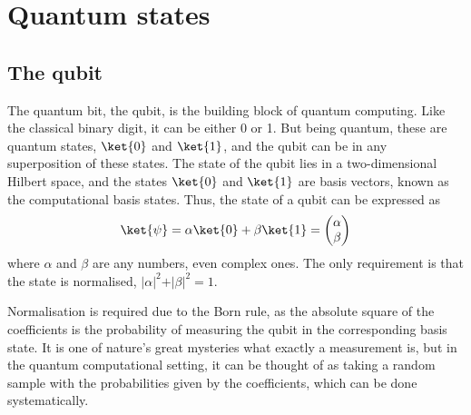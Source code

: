 \section{Quantum states}
\subsection{The qubit}
The quantum bit, the qubit, is the building block of quantum computing.
Like the classical binary digit, it can be either 0 or 1.
But being quantum, these are quantum states, $\ket{0}$ and $\ket{1}$\footnotemark{}, and the qubit can be in any superposition of these states.
The state of the qubit lies in a two-dimensional Hilbert space, and the states $\ket{0}$ and $\ket{1}$ are basis vectors, known as the computational basis states.
Thus, the state of a qubit can be expressed as
\begin{equation}
    \ket{\psi} = \alpha \ket{0} + \beta \ket{1} = \begin{pmatrix} \alpha \\ \beta \end{pmatrix}
    \label{eq:qubit}
\end{equation}
where $\alpha$ and $\beta$ are any numbers, even complex ones.
The only requirement is that the state is normalised, $\vert\alpha\vert^2 + \vert\beta\vert^2 = 1$.


Normalisation is required due to the Born rule, as the absolute square of the coefficients is the probability of measuring the qubit in the corresponding basis state.
It is one of nature's great mysteries what exactly a measurement is, but in the quantum computational setting, it can be thought of as taking a random sample with the probabilities given by the coefficients, which can be done systematically.

